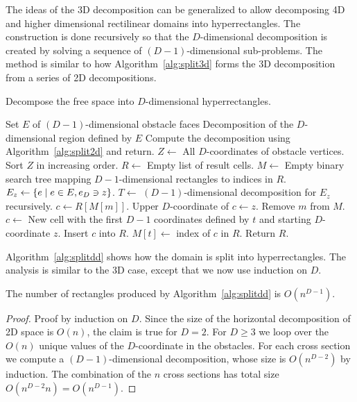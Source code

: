 \documentclass[english,gradu]{tktltiki2018}
\begin{document}
The ideas of the 3D decomposition can be generalized to allow decomposing 4D and higher dimensional rectilinear domains into hyperrectangles.
The construction is done recursively so that the $D$-dimensional decomposition is created by solving a sequence of $(D-1)$-dimensional sub-problems.
The method is similar to how Algorithm~\ref{alg:split3d} forms the 3D decomposition from a series of 2D decompositions.

\begin{algorithm}
\caption{Decompose the free space into $D$-dimensional hyperrectangles.}
\label{alg:splitdd}
\begin{algorithmic}
\Require Set $E$ of $(D-1)$-dimensional obstacle faces
\Ensure Decomposition of the $D$-dimensional region defined by $E$
	\State Compute the decomposition using Algorithm~\ref{alg:split2d} and return.
\EndIf
\State $Z\gets$ All $D$-coordinates of obstacle vertices.
\State Sort $Z$ in increasing order.
\State $R\gets$ Empty list of result cells.
\State $M\gets$ Empty binary search tree mapping $D-1$-dimensional rectangles to indices in $R$.
	\State $E_z\gets\left\{e \mid e\in E, e_D\ni z\right\}$.
	\State $T\gets$ $(D-1)$-dimensional decomposition for $E_z$ recursively.
		\State $c\gets R[M[m]]$.
		\State Upper $D$-coordinate of $c\gets z$.
		\State Remove $m$ from $M$.
	\EndFor
		\State $c\gets$ New cell with the first $D-1$ coordinates defined by $t$ and starting $D$-coordinate $z$.
		\State Insert $c$ into $R$.
		\State $M[t]\gets$ index of $c$ in $R$.
	\EndFor
\EndFor
\State Return $R$.
\end{algorithmic}
\end{algorithm}

Algorithm~\ref{alg:splitdd} shows how the domain is split into hyperrectangles.
The analysis is similar to the 3D case, except that we now use induction on $D$.

\begin{lem}\label{lem:splitddcells}The number of rectangles produced by Algorithm~\ref{alg:splitdd} is $O(n^{D-1})$.\end{lem}
\begin{proof}
Proof by induction on $D$.
Since the size of the horizontal decomposition of 2D space is $O(n)$, the claim is true for $D=2$.
For $D\ge 3$ we loop over the $O(n)$ unique values of the $D$-coordinate in the obstacles.
For each cross section we compute a $(D-1)$-dimensional decomposition, whose size is $O(n^{D-2})$ by induction.
The combination of the $n$ cross sections has total size $O(n^{D-2}n)=O(n^{D-1})$.
\end{proof}
\end{document}
